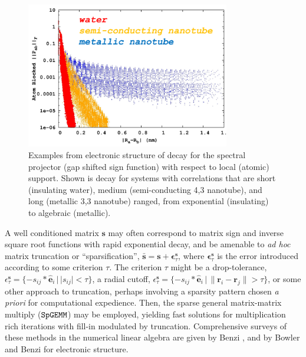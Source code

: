 \documentclass[letterpaper,twocolumn,amsmath,amsfont,amssymb,english,aps,jcp,preprintnumbers,groupaddress,nofootinbib,tightenlines,floatfix]{revtex4}
\newcommand{\mat}[1]{\boldsymbol{#1}}
\theoremstyle{plain}
\theoremstyle{remark}
\theoremstyle{plain}
\begin{document}
\begin{figure}[h]\label{figure1}
 \includegraphics[width=3.5in]{decay_picture.png}
  \caption{Examples from electronic structure of decay for the
    spectral projector (gap shifted sign function) with respect to
    local (atomic) support.  Shown is decay for systems with
    correlations that are short (insulating water), medium
    (semi-conducting 4,3 nanotube), and long (metallic 3,3 nanotube)
    ranged, from exponential (insulating) to algebraic (metallic). }
\end{figure}

A well conditioned matrix $\mat{s}$ may often correspond to matrix
sign and inverse square root functions with rapid exponential decay,
and be amenable to {\em ad hoc} matrix truncation or ``sparsification'', 
$\bar{\mat{s}} = \mat{s}+ \mat{\epsilon}^{\mat{s}}_\tau$,
where $\mat{\epsilon}^{\mat{s}}_\tau$ is the error introduced
according to some criterion $\tau$.  
The criterion $\tau$ might be a drop-tolerance,
$\epsilon^{\mat{s}}_{\tau} = \{-s_{ij}*\hat{\mat{e}}_i \, | \, |s_{ij}|<\tau \}$,
a radial cutoff,
$\epsilon^{\mat{s}}_{\tau} = \{-s_{ij}*\hat{\mat{e}}_i \, | \, \lVert \mat{r}_i - \mat{r}_j \rVert > \tau \}$,
or some other approach to truncation, perhaps involving a sparsity
pattern chosen {\em a priori} for computational expedience.
Then, the sparse general matrix-matrix multiply ($\tt{SpGEMM}$)
\cite{Gustavson78, Toledo97, challacombe00, bowler00} may be employed, yielding fast
solutions for multiplication rich iterations with fill-in modulated by truncation.
Comprehensive surveys of these
methods in the numerical linear algebra are given by Benzi
\cite{Benzi99,Benzi02}, and by Bowler \cite{Bowler12} and Benzi \cite{Benzi13}
for electronic structure.
\end{document}
